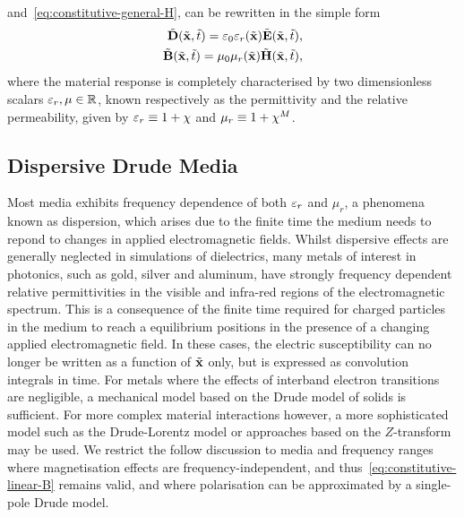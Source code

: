 and~\eqref{eq:constitutive-general-H}, can be rewritten in the simple form
\begin{subequations}
  \label{eq:constitutive-linear}
  \begin{align}
    \tilde{\mathbf{D}}(\tilde{\mathbf{x}},\tilde{t}) = \varepsilon_0 \varepsilon_r(\tilde{\mathbf{x}}) \tilde{\mathbf{E}}(\tilde{\mathbf{x}},\tilde{t}), \label{eq:constitutive-linear-D} \\
    \tilde{\mathbf{B}}(\tilde{\mathbf{x}},\tilde{t}) = \mu_0 \mu_r(\tilde{\mathbf{x}}) \tilde{\mathbf{H}}(\tilde{\mathbf{x}},\tilde{t}),\label{eq:constitutive-linear-B}
  \end{align}
\end{subequations}
where the material response is completely characterised by two dimensionless
scalars $ \varepsilon_r, \mu \in \mathbb{R}$, known respectively as the permittivity and the
relative permeability, given by $\varepsilon_r \equiv 1 + \chi $ and $\mu_r
\equiv 1 + \chi^{M} $.

\subsection{Dispersive Drude Media}
Most media exhibits frequency dependence of both $\varepsilon_r$ and $\mu_r$, a
phenomena known as dispersion, which arises due to the finite time the medium needs to
repond to changes in applied electromagnetic fields.
Whilst dispersive effects are generally neglected in simulations of dielectrics, many metals
of interest in photonics, such as gold, silver and aluminum,
have strongly frequency dependent relative permittivities in the visible and infra-red
regions of the electromagnetic spectrum\cite{Ordal:1983bg}. This is a
consequence of the finite time required for charged particles in the medium to
reach a equilibrium positions in the presence of a changing applied
electromagnetic field. In these cases, the electric susceptibility can
no longer be written as a function of $\tilde{\mathbf{x}}$ only, but is expressed
as convolution integrals in time\cite{Jackson:490457}.
For metals where the effects of interband electron transitions are negligible, a
mechanical model based on the Drude model of solids is
sufficient\cite{taflove2013advances}. For more complex material interactions however,
a more sophisticated model such as the Drude-Lorentz model\cite{Fox:2001wm,Taflove:1989ds}
or approaches based on the $Z$-transform\cite{sullivan1996z} may be used.
We restrict the follow discussion to media and frequency ranges where
magnetisation effects are frequency-independent, and thus~\eqref{eq:constitutive-linear-B} remains valid,
and where polarisation can be approximated by a single-pole Drude model.

